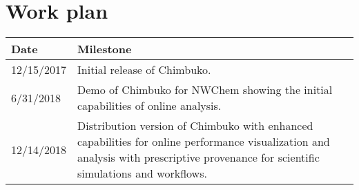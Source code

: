 \section{Work plan}

\begin{tabular}{|p{0.7in}|p{5.5in}|}\hline
\textbf{Date}  & \textbf{Milestone} \\\hline
12/15/2017 & Initial release of Chimbuko. \\\hline
6/31/2018 &  Demo of Chimbuko for NWChem showing the initial capabilities of online analysis.\\\hline
12/14/2018 & Distribution version of Chimbuko with enhanced capabilities for online performance visualization and analysis with prescriptive provenance for scientific simulations and workflows. \\\hline

\end{tabular}
